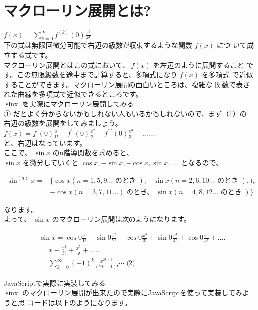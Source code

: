 \documentclass[10pt]{article}
\begin{document}
\section*{マクローリン展開とは?}
$f(x)=\sum_{k=0}^{\infty} f^{(k)}(0) \frac{x^{k}}{k!}$\\
下の式は無限回微分可能で右辺の級数が収束するような関数 $f(x)$ につ いて成立する式です。\\
マクローリン展開とはこの式において、 $f(x)$ を左辺のように展開すること です。この無限級数を途中まで計算すると、多項式になり $f(x)$ を多項式 で近似することができます。マクローリン展開の面白いところは、複雑な 関数で表された曲線を多項式で近似できるところです。\\
$\operatorname{sinx}$ を実際にマクローリン展開してみる\\
① だとよく分からないかもしれない人もいるかもしれないので、まず（1）の 右辺の級数を展開をしてみましょう。\\
$f(x)=f^{\prime}(0) \frac{x}{1!}+f^{\prime \prime}(0) \frac{x^{2}}{2!}+f^{\prime \prime \prime}(0) \frac{x^{3}}{3!}+\ldots \ldots$.\\
と、右辺はなっています。\\
ここで、 $\sin x$ のn階導関数を求めると、\\
$\sin x$ を微分していくと $\cos x,-\sin x,-\cos x, \sin x, \ldots$. となるので、

$$
\begin{aligned}
\sin ^{(n)} x= & \{\cos x(n=1,5,9 \ldots \text { のとき }),-\sin x(n=2,6,10 \ldots \text { のとき }),), \\
& -\cos x(n=3,7,11 \ldots) \text { のとき、 } \sin x(n=4,8,12 \ldots \text { のとき })\}
\end{aligned}
$$

なります。\\
よって、 $\sin x$ のマクローリン展開は次のようになります。

$$
\begin{aligned}
& \sin x=\cos 0 \frac{x}{1!}-\sin 0 \frac{x^{2}}{2!}-\cos 0 \frac{x^{3}}{3!}+\sin 0 \frac{x^{4}}{4!}+\cos 0 \frac{x^{5}}{5!}+\ldots . \\
& =x-\frac{x^{3}}{3!}+\frac{x^{5}}{5!}+\ldots . . \\
& =\sum_{k=0}^{\infty}(-1)^{k} \frac{x^{2 k+1}}{(2 k+1)!} \cdots \text { (2) }
\end{aligned}
$$

JavaScriptで実際に実装してみる\\
$\operatorname{sinx}$ のマクローリン展開が出来たので実際にJavaScriptを使って実装してみようと思 コードは以下のようになります。
\end{document}
